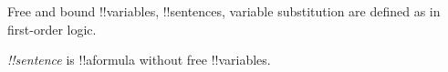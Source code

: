 \documentclass[../../../include/open-logic-section]{subfiles}
\begin{document}


Free and bound !!{variable}s, !!{sentence}s, variable substitution are defined as in
first-order logic.

 \emph{!!{sentence}} is !!a{formula} without free
!!{variable}s.
\end{document}
